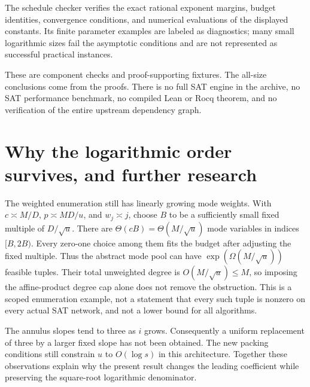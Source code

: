 \documentclass[11pt,letterpaper]{article}
\theoremstyle{remark}\newtheorem{remark}[theorem]{Remark}
\begin{document}
The schedule checker verifies the exact rational exponent margins,
budget identities, convergence conditions, and numerical evaluations
of the displayed constants. Its finite parameter examples are labeled
as diagnostics; many small logarithmic sizes fail the asymptotic
conditions and are not represented as successful practical instances.

These are component checks and proof-supporting fixtures. The all-size
conclusions come from the proofs. There is no full SAT engine in the
archive, no SAT performance benchmark, no compiled Lean or Rocq theorem,
and no verification of the entire upstream dependency graph.

\section{Why the logarithmic order survives, and further research}
\label{sec:questions}
The weighted enumeration still has linearly growing mode weights.
With $c\asymp M/D$, $p\asymp MD/u$, and $w_j\asymp j$, choose
$B$ to be a sufficiently small fixed multiple of $D/\sqrt u$.
There are $\Theta(cB)=\Theta(M/\sqrt u)$ mode variables in indices
$[B,2B)$. Every zero-one choice among them fits the budget after adjusting
the fixed multiple. Thus the abstract mode pool can have
$\exp(\Omega(M/\sqrt u))$ feasible tuples. Their total unweighted degree
is $O(M/\sqrt u)\le M$, so imposing the affine-product degree cap alone
does not remove the obstruction. This is a scoped enumeration example,
not a statement that every such tuple is nonzero on every actual SAT
network, and not a lower bound for all algorithms.

The annulus slopes tend to three as $i$ grows. Consequently a uniform
replacement of three by a larger fixed slope has not been obtained.
The new packing conditions still constrain $u$ to $O(\log s)$ in this
architecture. Together these observations explain why the present
result changes the leading coefficient while preserving the square-root
logarithmic denominator.
\end{document}
